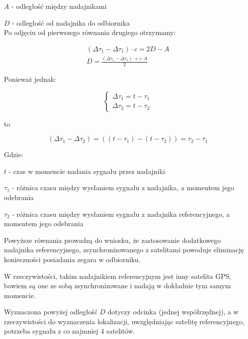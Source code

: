 $A$ - odległość między nadajnikami

$D$ - odległość od nadajnika do odbiornika\\

Po odjęciu od pierwszego równania drugiego otrzymamy:

\begin{gather}
(\Delta \tau_1  - \Delta \tau_1) \cdot c = 2D - A \\
D = \frac{(\Delta \tau_1  - \Delta \tau_1) \cdot c + A}{2} \nonumber 
\end{gather}

Ponieważ jednak:

\begin{equation}
\begin{cases}
	\Delta \tau_1 = t - \tau_1 \\
	\Delta \tau_2 = t- \tau_2
\end{cases}
\end{equation}

to

\begin{equation}
(\Delta \tau_1 - \Delta \tau_2) = ((t - \tau_1) - (t - \tau_2)) = \tau_2 - \tau_1
\end{equation}

Gdzie:

$t$ - czas w momencie nadania sygnału przez nadajniki

$\tau_1$ - różnica czasu między wysłaniem sygnału z nadajnika, a momentem jego odebrania

$\tau_2$ - różnica czasu między wysłaniem sygnału z nadajnika referencyjnego, a momentem jego odebrania

Powyższe równania prowadzą do wniosku, że zastosowanie dodatkowego nadajnika referencyjnego, zsynchronizowanego z satelitami powoduje eliminację konieczności posiadania zegara w odbiorniku.

W rzeczywistości, takim nadajnikiem referencyjnym jest inny satelita GPS, bowiem są one ze sobą zsynchronizowane i nadają w dokładnie tym samym momencie.

Wyznaczona powyżej odległość $D$ dotyczy odcinka (jednej współrzędnej), a w rzeczywistości do wyznaczenia lokalizacji, uwzględniając satelitę referencyjnego, potrzeba sygnału z co najmniej 4 satelitów.

